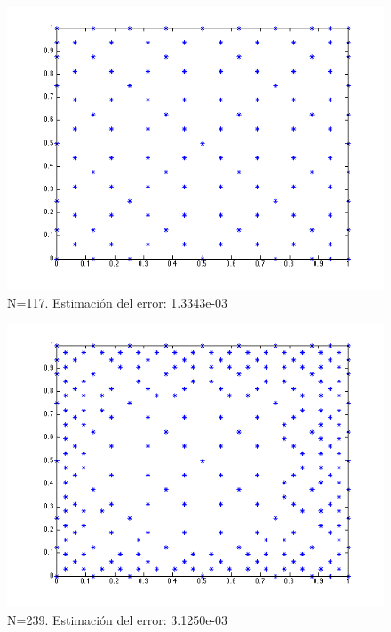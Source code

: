 \documentclass[11pt,a4paper]{article}
\begin{document}
\begin{itemize}
\begin{figure}[H]
\begin{center}
\includegraphics[scale=0.4]{edp3_117.png}
\caption{N=117. Estimación del error: 1.3343e-03}
\end{center}
\end{figure}
\begin{figure}[H]
\begin{center}
\includegraphics[scale=0.4]{edp3_239.png}
\caption{N=239. Estimación del error: 3.1250e-03}
\end{center}
\end{figure}
\end{itemize}
\end{document}
